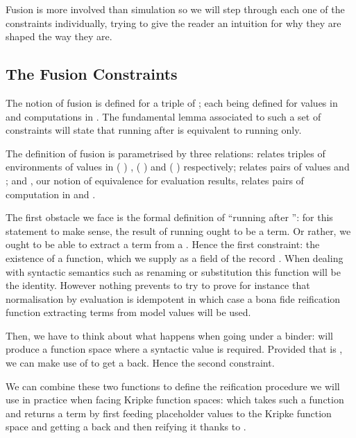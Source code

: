 Fusion is more involved than simulation so we will step through
each one of the constraints individually, trying to give the reader an intuition
for why they are shaped the way they are.


\subsection{The Fusion Constraints}

The notion of fusion is defined for a triple of ; each 
being defined for values in  and computations in . The
fundamental lemma associated to such a set of constraints will state that
running  after  is equivalent to running  only.

The definition of fusion is parametrised by three relations:  relates
triples of environments of values in {( )  },
{( )  } and {( )  }
respectively;  relates pairs of values  and ;
and , our notion of equivalence for evaluation results, relates pairs
of computation in  and .


The first obstacle we face is the formal definition of ``running 
after '': for this statement to make sense, the result of running
 ought to be a term. Or rather, we ought to be able to extract a
term from a . Hence the first constraint: the existence of a
 function, which we supply as a field of the record .
When dealing with syntactic semantics such as renaming or substitution
this function will be the identity. However nothing prevents to try to prove for
instance that normalisation by evaluation is idempotent in which case a bona fide
reification function extracting terms from model values will be used.


Then, we have to think about what happens when going under a binder: 
will produce a  function space where a syntactic value is required.
Provided that  is , we can make use of  to get a
 back. Hence the second constraint.


We can combine these two functions to define the reification procedure we will
use in practice when facing Kripke function spaces:  which takes such
a function and returns a term by first feeding placeholder values to the Kripke
function space and getting a  back and then reifying it thanks to .


